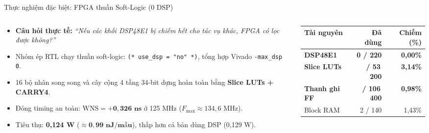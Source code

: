\begin{frame}{Thực nghiệm đặc biệt: FPGA thuần Soft-Logic (0 DSP)}
\begin{columns}[T]
\begin{column}{0.51\linewidth}\small
\begin{itemize}\setlength{\itemsep}{3pt}
\item \textbf{Câu hỏi thực tế:} \emph{``Nếu các khối DSP48E1 bị chiếm hết cho tác vụ khác, FPGA có lọc được không?''}
\item Nhóm ép RTL chạy thuần soft-logic: \texttt{(* use\_dsp = "no" *)}, tổng hợp Vivado \texttt{-max\_dsp 0}.
\item 16 bộ nhân song song và cây cộng 4 tầng 34-bit dựng hoàn toàn bằng \textbf{Slice LUTs + CARRY4}.
\item Đóng timing an toàn: $\text{WNS} = \mathbf{+0{,}326\text{ ns}}$ ở 125 MHz ($F_{\max} \approx 134{,}6\text{ MHz}$).
\item Tiêu thụ: \textbf{0,124 W} ($\approx \mathbf{0{,}99\text{ nJ/mẫu}}$), thấp hơn cả bản dùng DSP (0,129 W).
\end{itemize}
\end{column}
\begin{column}{0.45\linewidth}\footnotesize
\begin{tabularx}{\linewidth}{@{}l r r@{}}
\toprule
Tài nguyên & Đã dùng & Chiếm (\%) \\
\midrule
\textbf{DSP48E1} & \textbf{0 / 220} & \textbf{0,00\%} \\
\textbf{Slice LUTs} & \textbf{\expFpgaLut{} / 53\,200} & \textbf{3,14\%} \\
\textbf{Thanh ghi FF} & \textbf{\expFpgaFf{} / 106\,400} & \textbf{0,98\%} \\
Block RAM & 2 / 140 & 1,43\% \\
\bottomrule
\end{tabularx}
\par\vspace{4pt}
\end{column}
\end{columns}
\end{frame}

